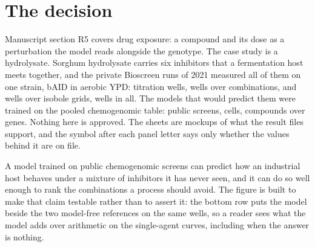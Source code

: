 
\section{The decision}
\label{sec:decision}

Manuscript section R5 covers drug exposure: a compound and its dose as a perturbation the
model reads alongside the genotype. The case study is a hydrolysate. Sorghum hydrolysate
carries six inhibitors that a fermentation host meets together, and the private Bioscreen
runs of 2021 measured all \hydnInhibitors{} of them on one strain, bAID in aerobic YPD:
\hydnExTwoOneWells{} titration wells, \hydnExTwoThreeWells{} wells over
\hydnCombinations{} combinations, and \hydnIsoboleWells{} wells over \hydnIsoboles{}
isobole grids, \hydnWells{} wells in all. The models that would predict them were trained
on the pooled chemogenomic table: \hydnScreens{} public screens, \hydnPoolCells{} cells,
\hydnPoolCompounds{} compounds over \hydnPoolGenes{} genes. Nothing here is approved. The
sheets are mockups of what the result files support, and the symbol after each panel
letter says only whether the values behind it are on file. 

 A model trained on public chemogenomic screens can
predict how an industrial host behaves under a mixture of inhibitors it has never seen,
and it can do so well enough to rank the combinations a process should avoid. The figure
is built to make that claim testable rather than to assert it: the bottom row puts the
model beside the two model-free references on the same wells, so a reader sees what the
model adds over arithmetic on the single-agent curves, including when the answer is
nothing.

